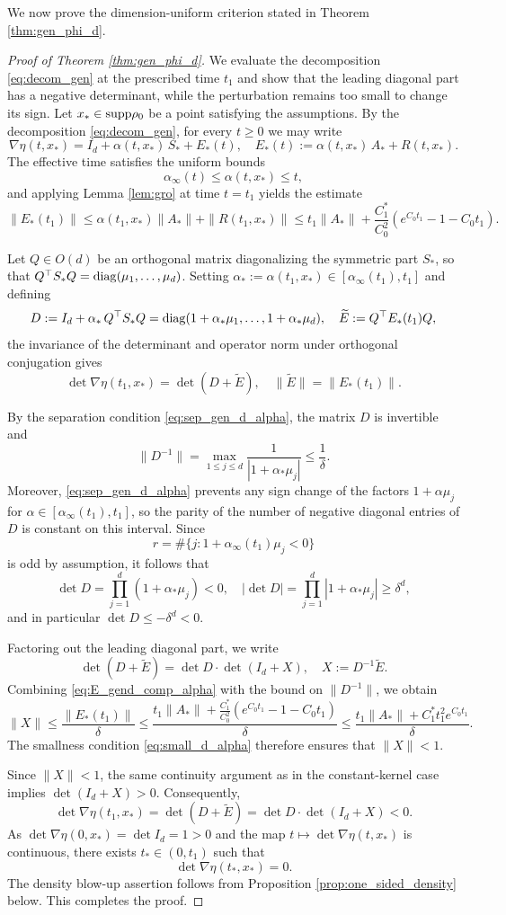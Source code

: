 \documentclass[11pt]{amsart}
\numberwithin{equation}{section}
\theoremstyle{definition}
\theoremstyle{remark}
\numberwithin{equation}{section}
\newcommand{\bq}{\begin{equation}}
\newcommand{\eq}{\end{equation}}
\newcommand{\lt}{\left}
\newcommand{\rt}{\right}
\newcommand{\supp}{{\rm supp}}
\newcommand{\diag}{{\rm diag}}
\renewcommand{\ge}{\geqslant}
\renewcommand{\le}{\leqslant}
\begin{document}
 We now prove the dimension-uniform criterion stated in Theorem \ref{thm:gen_phi_d}. 
 

\begin{proof}[Proof of Theorem \ref{thm:gen_phi_d}]
We evaluate the decomposition \eqref{eq:decom_gen} at the prescribed time $t_1$ and show that the leading diagonal part has a negative determinant, while the perturbation remains too small to change its sign.   Let $x_*\in\supp\rho_0$ be a point satisfying the assumptions. By the decomposition \eqref{eq:decom_gen}, for every $t\ge0$ we may write
\[
\nabla\eta(t,x_*) = I_d+\alpha(t,x_*)\,S_*+E_*(t),
\quad
E_*(t):=\alpha(t,x_*)\,A_*+R(t,x_*).
\]
The effective time satisfies the uniform bounds
\[
\alpha_\infty(t)\le \alpha(t,x_*)\le t,
\]
and applying Lemma \ref{lem:gro} at time $t=t_1$ yields the estimate
\bq\label{eq:E_gend_comp_alpha}
\|E_*(t_1)\|
\le
\alpha(t_1,x_*)\|A_*\|+\|R(t_1,x_*)\|
\le
t_1\|A_*\|+\frac{C_1^*}{C_0^2}\lt(e^{C_0t_1}-1-C_0t_1\rt).
\eq

Let $Q\in O(d)$ be an orthogonal matrix diagonalizing the symmetric part $S_*$, so that $Q^\top S_*Q=\diag(\mu_1,\dots,\mu_d)$. Setting $\alpha_*:=\alpha(t_1,x_*)\in[\alpha_\infty(t_1),t_1]$ and defining
\[
D:=I_d+\alpha_*\,Q^\top S_*Q = \diag(1+\alpha_*\mu_1,\dots,1+\alpha_*\mu_d),
\quad
\widetilde E:=Q^\top E_*(t_1)Q,
\]
the invariance of the determinant and operator norm under orthogonal conjugation gives
\[
\det\nabla\eta(t_1,x_*)=\det(D+\widetilde E),
\quad
\|\widetilde E\|=\|E_*(t_1)\|.
\]

By the separation condition \eqref{eq:sep_gen_d_alpha}, the matrix $D$ is invertible and
\[
\|D^{-1}\| = \max_{1\le j\le d}\frac{1}{|1+\alpha_*\mu_j|} \le \frac{1}{\delta}.
\]
Moreover, \eqref{eq:sep_gen_d_alpha} prevents any sign change of the factors $1+\alpha\mu_j$ for $\alpha\in[\alpha_\infty(t_1),t_1]$, so the parity of the number of negative diagonal entries of $D$ is constant on this interval. Since
\[
r = \# \{ j : 1+\alpha_\infty(t_1)\mu_j<0\}
\]
is odd by assumption, it follows that
\[
\det D=\prod_{j=1}^d(1+\alpha_*\mu_j)<0,
\quad
|\det D|=\prod_{j=1}^d|1+\alpha_*\mu_j|\ge \delta^d,
\]
and in particular $\det D\le -\delta^d<0$.

Factoring out the leading diagonal part, we write
\[
\det(D+\widetilde E)=\det D\cdot \det(I_d+X), \quad X:=D^{-1}\widetilde E.
\]
Combining \eqref{eq:E_gend_comp_alpha} with the bound on $\|D^{-1}\|$, we obtain
\[
\|X\| \le \frac{\|E_*(t_1)\|}{\delta} \le \frac{t_1\|A_*\|+\frac{C_1^*}{C_0^2}(e^{C_0t_1}-1-C_0t_1)}{\delta}  \le \frac{t_1\|A_*\| + C_1^* t_1^2 e^{C_0 t_1}}{\delta}.
\]
The smallness condition \eqref{eq:small_d_alpha} therefore ensures that $\|X\|<1$.

Since $\|X\|<1$, the same continuity argument as in the constant-kernel case implies
$\det(I_d+X)>0$. Consequently,
\[
\det\nabla\eta(t_1,x_*) = \det(D+\widetilde E) = \det D\cdot \det(I_d+X) < 0.
\]
As $\det\nabla\eta(0,x_*)=\det I_d=1>0$ and the map $t\mapsto\det\nabla\eta(t,x_*)$ is continuous, there exists $t_*\in(0,t_1)$ such that
\[
\det\nabla\eta(t_*,x_*)=0.
\]
The density blow-up assertion follows from Proposition \ref{prop:one_sided_density} below.  This completes the proof.
\end{proof}
 
\end{document}
